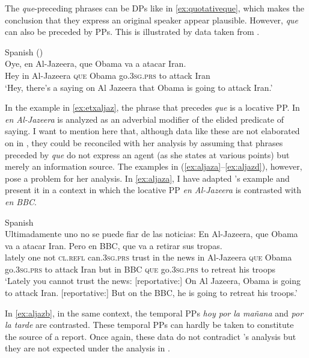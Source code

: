 The \emph{que}-preceding phrases can be DPs like in \eqref{ex:quotativeque}, which makes the conclusion that they express an original speaker appear plausible. However, \emph{que} can also  be preceded by PPs.  This is illustrated by  data  taken from \citet{Etxepare2013}.  

\ea\label{ex:etxaljaz}
 Spanish (\citealt[98: ex 11]{Etxepare2013})\\ 
 \gll Oye, en Al-Jazeera, que Obama va a atacar Iran. \\
	Hey in Al-Jazeera \textsc{que} Obama go.\textsc{3sg.prs} to attack Iran\\
	\glt `Hey, there’s a saying on Al Jazeera that Obama is going to attack Iran.' 
\z

 In the example in \eqref{ex:etxaljaz},  the phrase that precedes \emph{que} is a locative PP. In \citet{Etxepare2013} \emph{en Al-Jazeera} is analyzed as an adverbial modifier of the elided predicate of saying. I want to mention here that, although data like these are not elaborated on in \citet{Corr2016}, they could be reconciled with  her analysis by assuming that phrases preceded by \emph{que} do not express an agent (as she states at various points) but merely an information source.
 The examples in (\ref{ex:aljaza}--\ref{ex:aljazd}), however,   pose a problem for her analysis. In \eqref{ex:aljaza}, I have adapted  \citeauthor{Etxepare2013}'s example and present it in a context in which the locative PP \emph{en Al-Jazeera} is contrasted with \emph{en BBC}. 



\ea\label{ex:aljaza} 
 Spanish\\ 
\gll Ultimadamente uno no  se puede fiar de las noticias: En Al-Jazeera, que Obama va a atacar Iran. Pero en BBC, que va a retirar sus tropas. \\
lately one  not \textsc{cl.refl} can.\textsc{3sg.prs} trust in the news  in Al-Jazeera \textsc{que} Obama go.\textsc{3sg.prs} to attack Iran but in BBC \textsc{que} go.\textsc{3sg.prs} to retreat his troops\\
\glt `Lately you cannot trust the news: [reportative:] On Al Jazeera, Obama is going to attack Iran. [reportative:] But  on the BBC, he is going to retreat his troops.'
\z

In \eqref{ex:aljazb}, in the same context, the temporal PPs \emph{hoy por la mañana} and \emph{por la tarde} are contrasted. These temporal PPs can hardly be taken to constitute the source of a report. Once again, these data do not contradict \citeauthor{Etxepare2013}'s analysis but  they are not  expected under the analysis in \citet{Corr2016}. 

